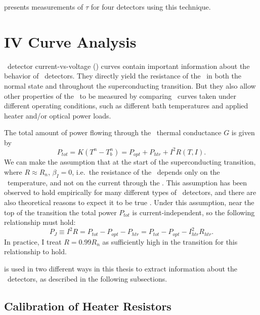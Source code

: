  presents measurements of $\tau$ for four detectors using this technique.

\section{\textsc{IV} Curve Analysis} \label{sec:ch3-iv-curve}

\TES\ detector current-vs-voltage (\IV) curves contain important information about the behavior of \TES\ detectors.
They directly yield the resistance of the \TES\ in both the normal state and throughout the superconducting transition.
But they also allow other properties of the \TES\ to be measured by comparing \IV\ curves taken under different operating conditions, such as different bath temperatures and applied heater and/or optical power loads.

The total amount of power flowing through the \TES\ thermal conductance $G$ is given by
\begin{equation}\label{eqn:ch3-tes-ptot}
P_{tot} = K(T^n - T_b^n) = P_{opt} + P_{htr} + I^2 R(T,I).
\end{equation}
We can make the assumption that at the start of the superconducting transition, where $R \approx R_n$, $\beta_I = 0$, i.e.\ the resistance of the \TES\ depends only on the \TES\ temperature, and not on the current through the \TES.
This assumption has been observed to hold empirically for many different types of \TES\ detectors, and there are also theoretical reasons to expect it to be true \cite{bennett_resistance_2013}.
Under this assumption, near the top of the transition the total power $P_{tot}$ is current-independent, so the following relationship must hold:
\begin{equation}\label{eqn:ch3-ptot-99Rn}
P_{J} \equiv I^2 R = P_{tot} - P_{opt} - P_{htr} = P_{tot} - P_{opt} - I_{htr}^2 R_{htr}.
\end{equation}
In practice, I treat $R = 0.99 R_n$ as sufficiently high in the transition for this relationship to hold.

 is used in two different ways in this thesis to extract information about the \TES\ detectors, as described in the following subsections.

\subsection{Calibration of Heater Resistors}

